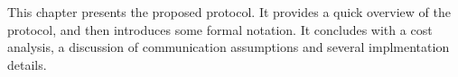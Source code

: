 \begin{mychapterabstract}
    This chapter presents the proposed protocol. It provides a quick overview
    of the protocol, and then introduces some formal notation.
    It concludes with a cost analysis, a discussion of communication assumptions
    and several implmentation details.
\end{mychapterabstract}
